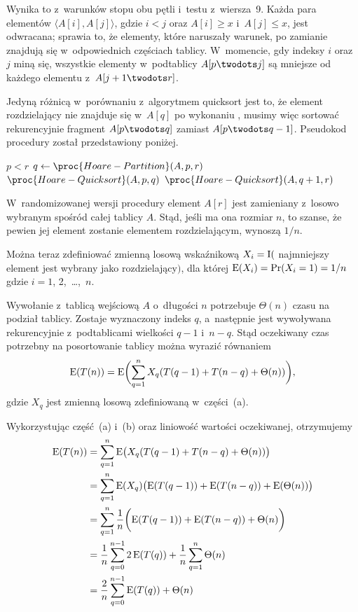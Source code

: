 \subproblem %
Wynika to z~warunków stopu obu pętli  i~testu z~wiersza~9. Każda para elementów $\langle A[i],A[j]\rangle$, gdzie $i<j$ oraz $A[i]\ge x$ i~$A[j]\le x$, jest odwracana; sprawia to, że elementy, które naruszały warunek, po zamianie znajdują się w~odpowiednich częściach tablicy. W~momencie, gdy indeksy $i$ oraz $j$ miną się, wszystkie elementy w~podtablicy $A[p\twodots j]$ są mniejsze od każdego elementu z~$A[j+1\twodots r]$.

\subproblem %
Jedyną różnicą w~porównaniu z~algorytmem quicksort jest to, że element rozdzielający nie znajduje się w~$A[q]$ po wykonaniu , musimy więc sortować rekurencyjnie fragment $A[p\twodots q]$ zamiast $A[p\twodots q-1]$. Pseudokod procedury został przedstawiony poniżej.
\begin{codebox}
\li	\If $p<r$
\li		\Then
			$q\gets\proc{Hoare-Partition}(A,p,r)$
\li			$\proc{Hoare-Quicksort}(A,p,q)$
\li			$\proc{Hoare-Quicksort}(A,q+1,r)$
		\End
\end{codebox}


\subproblem %
W~randomizowanej wersji procedury  element $A[r]$ jest zamieniany z~losowo wybranym spośród całej tablicy $A$. Stąd, jeśli ma ona rozmiar $n$, to szanse, że pewien jej element zostanie elementem rozdzielającym, wynoszą $1/n$.

Można teraz zdefiniować zmienną losową wskaźnikową $X_i=\operatorname{I}($ najmniejszy element jest wybrany jako rozdzielający$)$, dla której $\operatorname{E}(X_i)=\Pr(X_i=1)=1/n$ gdzie $i=1$, 2,~\dots,~$n$.

\subproblem %
Wywołanie  z~tablicą wejściową $A$ o~długości $n$ potrzebuje $\Theta(n)$ czasu na podział tablicy. Zostaje wyznaczony indeks $q$, a~następnie jest wywoływana rekurencyjnie  z~podtablicami wielkości $q-1$ i~$n-q$. Stąd oczekiwany czas potrzebny na posortowanie  tablicy można wyrazić równaniem
\[
	\operatorname{E}(T(n)) = \operatorname{E}\biggl(\sum_{q=1}^nX_q(T(q-1)+T(n-q)+\Theta(n))\biggr),
\]
gdzie $X_q$ jest zmienną losową zdefiniowaną w~części~(a).

\subproblem %
Wykorzystując część~(a) i~(b) oraz liniowość wartości oczekiwanej, otrzymujemy
\begin{align*}
	\operatorname{E}(T(n)) &= \sum_{q=1}^n\operatorname{E}\bigl(X_q(T(q-1)+T(n-q)+\Theta(n))\bigr) \\
	&= \sum_{q=1}^n\operatorname{E}(X_q)\bigl(\operatorname{E}(T(q-1))+\operatorname{E}(T(n-q))+\operatorname{E}(\Theta(n))\bigr) \\
	&= \sum_{q=1}^n\frac{1}{n}\biggl(\operatorname{E}(T(q-1))+\operatorname{E}(T(n-q))+\Theta(n)\biggr) \\
	&= \frac{1}{n}\sum_{q=0}^{n-1}2\operatorname{E}(T(q))+\frac{1}{n}\sum_{q=1}^n\Theta(n) \\
	&= \frac{2}{n}\sum_{q=0}^{n-1}\operatorname{E}(T(q))+\Theta(n)
\end{align*}

